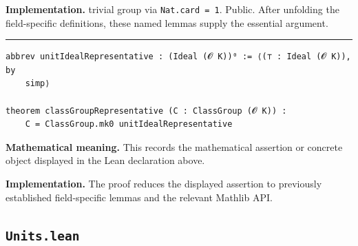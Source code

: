 \documentclass[UTF8,a4paper,11pt,fontset=fandol]{ctexart}
\theoremstyle{definition}
\newcommand{\statementsep}{\par\medskip\hrule\medskip}
\begin{document}
\noindent\textbf{Implementation.} trivial group via \texttt{Nat.\allowbreak{}card = 1}. Public. After unfolding the field-specific definitions, these named lemmas supply the essential argument.\par
\statementsep
\begin{verbatim}
abbrev unitIdealRepresentative : (Ideal (𝓞 K))⁰ := ⟨(⊤ : Ideal (𝓞 K)), by
    simp⟩

theorem classGroupRepresentative (C : ClassGroup (𝓞 K)) :
    C = ClassGroup.mk0 unitIdealRepresentative
\end{verbatim}
\noindent\textbf{Mathematical meaning.} This records the mathematical assertion or concrete object displayed in the Lean declaration above.\par
\noindent\textbf{Implementation.} The proof reduces the displayed assertion to previously established field-specific lemmas and the relevant Mathlib API.\par

\subsection{\texttt{Units.lean}}
\end{document}
